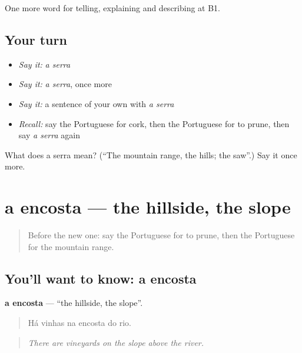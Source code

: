 \begin{grammarlens}[title={What you've built}]
One more word for telling, explaining and describing at B1.
\end{grammarlens}

\subsection*{Your turn}
\begin{itemize}
\raggedright
  \item \emph{Say it:} \emph{a serra}
  \item \emph{Say it:} \emph{a serra}, once more
  \item \emph{Say it:} a sentence of your own with \emph{a serra}
  \item \emph{Recall:} say the Portuguese for cork, then the Portuguese for to prune, then say \emph{a serra} again
\end{itemize}

\begin{tcolorbox}[breakable,colback=teal!4,colframe=teal!35!black,title={Before you move on}]
What does a serra mean? (\textquotedblleft{}The mountain range, the hills; the saw\textquotedblright{}.) Say it once more.
\end{tcolorbox}
\section[a encosta]{a encosta — the hillside, the slope}

\label{lesson:PT-C458-encosta}



\begin{quote}
Before the new one: say the Portuguese for to prune, then the Portuguese for the mountain range.
\end{quote}

\subsection*{You'll want to know: a encosta}
\textbf{a encosta} — \textquotedblleft{}the hillside, the slope\textquotedblright{}.

\begin{quote}
Há vinhas na encosta do rio.
\end{quote}

\begin{quote}
\emph{There are vineyards on the slope above the river.}
\end{quote}

